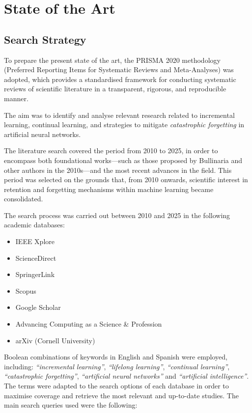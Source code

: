 \section{State of the Art}

\subsection{Search Strategy}
To prepare the present state of the art, the PRISMA 2020 methodology (Preferred Reporting Items for Systematic Reviews and Meta-Analyses) was adopted, which provides a standardised framework for conducting systematic reviews of scientific literature in a transparent, rigorous, and reproducible manner.  

The aim was to identify and analyse relevant research related to incremental learning, continual learning, and strategies to mitigate \textit{catastrophic forgetting} in artificial neural networks.  

The literature search covered the period from 2010 to 2025, in order to encompass both foundational works—such as those proposed by Bullinaria and other authors in the 2010s—and the most recent advances in the field.  
This period was selected on the grounds that, from 2010 onwards, scientific interest in retention and forgetting mechanisms within machine learning became consolidated.  

The search process was carried out between 2010 and 2025 in the following academic databases:
\begin{itemize}
    \item IEEE Xplore
    \item ScienceDirect
    \item SpringerLink
    \item Scopus
    \item Google Scholar
    \item Advancing Computing as a Science \& Profession
    \item arXiv (Cornell University)
\end{itemize}

Boolean combinations of keywords in English and Spanish were employed, including: 
\textit{``incremental learning''}, \textit{``lifelong learning''}, \textit{``continual 
learning''}, \textit{``catastrophic forgetting''}, \textit{``artificial neural networks''} 
and \textit{``artificial intelligence''}. The terms were adapted to the search options of 
each database in order to maximise coverage and retrieve the most relevant and up-to-date 
studies. The main search queries used were the following:

